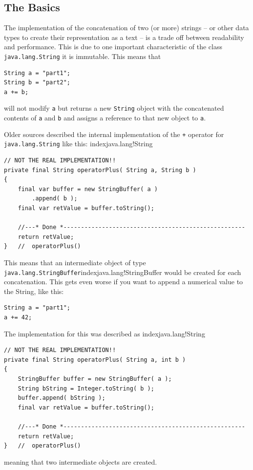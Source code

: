 
\subsection{The Basics}
The implementation of the concatenation of two (or more) strings – or other data types to create their representation as a text – is a trade off between readability and performance. This is due to one important characteristic of the class \lstinline|java.lang.String|\autocite{ORACLE_DOC_STRING_CLASS} it is immutable. This means that
\begin{lstlisting}
String a = "part1";
String b = "part2";
a += b;
\end{lstlisting}
will not modify \lstinline|a| but returns a new \lstinline|String| object with the concatenated contents of \lstinline|a| and \lstinline|b| and assigns a reference to that new object to \lstinline|a|.

Older sources described the internal implementation of the \lstinline|+| operator for \lstinline|java.lang.String| like this:
index{java.lang!String}
\begin{lstlisting}
// NOT THE REAL IMPLEMENTATION!!
private final String operatorPlus( String a, String b )
{
    final var buffer = new StringBuffer( a )
        .append( b );
    final var retValue = buffer.toString();
    
    //---* Done *----------------------------------------------------
    return retValue;
}   //  operatorPlus()
\end{lstlisting}

This means that an intermediate object of type \lstinline|java.lang.StringBuffer|\autocite{ORACLE_DOC_STRINGBUFFER_CLASS}index{java.lang!StringBuffer} would be created for each concatenation. This gets even worse if you want to append a numerical value to the String, like this:
\begin{lstlisting}
String a = "part1";
a += 42;
\end{lstlisting}

The implementation for this was described as
index{java.lang!String}
\begin{lstlisting}
// NOT THE REAL IMPLEMENTATION!!
private final String operatorPlus( String a, int b )
{
    StringBuffer buffer = new StringBuffer( a );
    String bString = Integer.toString( b );
    buffer.append( bString );
    final var retValue = buffer.toString();
    
    //---* Done *----------------------------------------------------
    return retValue;
}   //  operatorPlus()
\end{lstlisting}
meaning that two intermediate objects are created.

